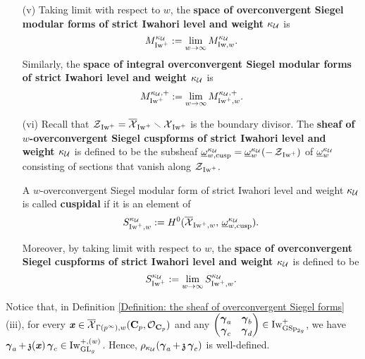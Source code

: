 \begin{Definition}
\begin{enumerate}
\item[(v)] Taking limit with respect to $w$, the \textbf{space of overconvergent Siegel modular forms of strict Iwahori level and weight $\kappa_{\calU}$} is 
$$M_{\Iw^+}^{\kappa_{\calU}}:=\lim_{w\rightarrow\infty}M^{\kappa_{\calU}}_{\Iw, w}.$$
Similarly, the \textbf{space of integral overconvergent Siegel modular forms of strict Iwahori level and weight $\kappa_{\calU}$} is 
$$M^{\kappa_{\calU}, +}_{\Iw^+}:=\lim_{w\rightarrow\infty}M^{\kappa_{\calU},+}_{\Iw^+, w}.$$

\item[(vi)] Recall that $\calZ_{\Iw^+} = \overline{\calX}_{\Iw^+}\smallsetminus \calX_{\Iw^+}$ is the boundary divisor. The \textbf{sheaf of $w$-overconvergent Siegel cuspforms of strict Iwahori level and weight $\kappa_{\calU}$} is defined to be the subsheaf $\underline{\omega}_{w, \cusp}^{\kappa_{\calU}} = \underline{\omega}_{w}^{\kappa_{\calU}}(-\calZ_{\Iw^+})$ of $\underline{\omega}_{w}^{\kappa_{\calU}}$ consisting of sections that vanish along $\calZ_{\Iw^+}$.

A $w$-overconvergent Siegel modular form of strict Iwahori level and weight $\kappa_{\calU}$ is called \textbf{cuspidal} if it is an element of  \[
        S_{\Iw^+, w}^{\kappa_{\calU}}:= H^0(\overline{\calX}_{\Iw^+, w},\, \underline{\omega}_{w, \cusp}^{\kappa_{\calU}}).
\] 

Moreover, by taking limit with respect to $w$, the \textbf{space of overconvergent Siegel cuspforms of strict Iwahori level and weight $\kappa_{\calU}$} is defined to be $$S^{\kappa_{\calU}}_{\Iw^+}:=\lim_{w\rightarrow\infty}S^{\kappa_{\calU}}_{\Iw^+, w}.$$
\end{enumerate}
\end{Definition}

\begin{Remark}\label{Remark: well-defined}
\normalfont Notice that, in Definition \ref{Definition: the sheaf of overconvergent Siegel forms} (iii), for every $\bfitx\in \overline{\calX}_{\Gamma(p^{\infty}), w}(\C_p, \calO_{\C_p})$ and any $\begin{pmatrix}\bfgamma_a & \bfgamma_b \\ \bfgamma_c & \bfgamma_d\end{pmatrix}\in \Iw_{\GSp_{2g}}^+$, we have $\bfgamma_a+\frakz(\bfitx)\bfgamma_c\in \Iw^{+, (w)}_{\GL_g}$. Hence, $\rho_{\kappa_{\calU}}(\bfgamma_a+\frakz\bfgamma_c)$ is well-defined.
\end{Remark}

